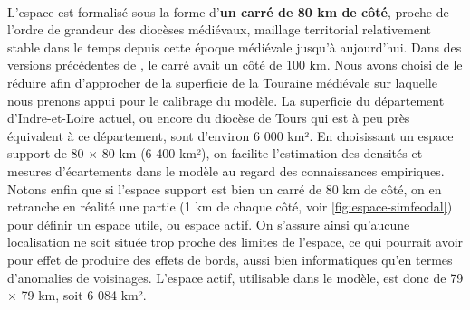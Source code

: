 \paragraph[Dimension]{}L'espace est formalisé sous la forme d'\textbf{un carré de 80 km de côté}, proche de l'ordre de grandeur des diocèses médiévaux, maillage territorial relativement stable dans le temps depuis cette époque médiévale jusqu'à aujourd'hui.
Dans des versions précédentes de \simfeodal{}, le carré avait un côté de 100 km. Nous avons choisi de le réduire afin d'approcher de la superficie de la Touraine médiévale sur laquelle nous prenons appui pour le calibrage du modèle. 
La superficie du département d'Indre-et-Loire actuel, ou encore du diocèse de Tours qui est à peu près équivalent à ce département, sont d'environ 6 000 km².
En choisissant un espace support de 80 $\times$ 80 km (6 400 km²), on facilite l'estimation des densités et mesures d'écartements dans le modèle au regard des connaissances empiriques.
Notons enfin que si l'espace support est bien un carré de 80 km de côté, on en retranche en réalité une partie (1 km de chaque côté, voir \cref{fig:espace-simfeodal}) pour définir un espace utile, ou \og espace actif\fg{}.
On s'assure ainsi qu'aucune localisation ne soit située trop proche des limites de l'espace, ce qui pourrait avoir pour effet de produire des \og effets de bords\fg{}, aussi bien informatiques qu'en termes d'anomalies de voisinages.
L'espace actif, utilisable dans le modèle, est donc de 79 $\times$ 79 km, soit 6 084 km².



